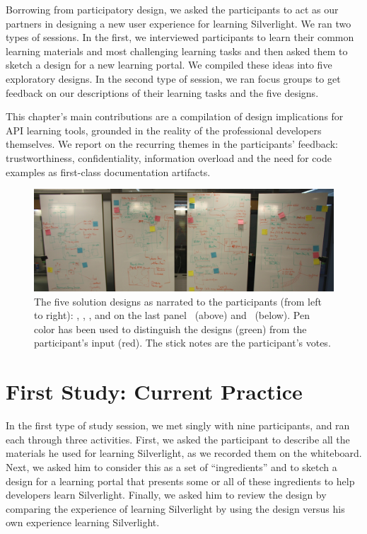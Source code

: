 Borrowing from participatory design, we asked the participants to act as our partners in designing a new user experience for learning Silverlight. We ran two types of sessions.  In the first, we interviewed participants to learn their common learning materials and  most challenging learning tasks and then asked them to sketch a design for a new learning portal. We compiled these ideas into five exploratory designs. In the second type of session, we ran focus groups to get feedback on our descriptions of their learning tasks and the five designs. 

This chapter's main contributions are a compilation of design implications for API learning tools, grounded in the reality of the professional developers themselves. We report on the recurring themes in the participants' feedback: trustworthiness, confidentiality, information overload and the need for code examples as first-class documentation artifacts.

\begin{figure}
    \includegraphics[width=\linewidth]{fig/api-learning-five-design}
    \caption{The five solution designs as narrated to the participants (from left to right): \ZoomableUML, \ConceptMap, \FacettedSearch, and on the last panel \RichIntellisense~(above) and \CloudREPL~(below). Pen color has been used to distinguish the designs (green) from the participant's input (red). The stick notes are the participant's votes.}
    \label{fivedesigns}
\end{figure} 

\moarsauce
\section{First Study: Current Practice}

In the first type of study session, we met singly with nine participants, and ran each through three activities. First, we asked the participant to describe all the  materials he used for learning Silverlight, as we recorded them on the whiteboard. Next, we asked him to consider this as a set of ``ingredients'' and to sketch a design for a learning portal that presents some or all of these ingredients to help developers learn Silverlight. Finally, we asked him to review the design by comparing the experience of learning Silverlight by using the design versus his own experience learning Silverlight.

